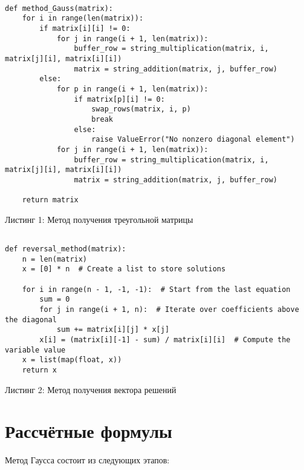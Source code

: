 \documentclass[14pt]{article}
\begin{document}
\begin{mdframed}
\footnotesize
\begin{verbatim}

def method_Gauss(matrix):
    for i in range(len(matrix)):
        if matrix[i][i] != 0:
            for j in range(i + 1, len(matrix)):
                buffer_row = string_multiplication(matrix, i, matrix[j][i], matrix[i][i])
                matrix = string_addition(matrix, j, buffer_row)
        else:
            for p in range(i + 1, len(matrix)):
                if matrix[p][i] != 0:
                    swap_rows(matrix, i, p)
                    break
                else:
                    raise ValueError("No nonzero diagonal element")
            for j in range(i + 1, len(matrix)):
                buffer_row = string_multiplication(matrix, i, matrix[j][i], matrix[i][i])
                matrix = string_addition(matrix, j, buffer_row)

    return matrix

\end{verbatim}
\end{mdframed}
\begin{center}
    Листинг 1: Метод получения треугольной матрицы
\end{center}

\begin{mdframed}
\small
\begin{verbatim}

def reversal_method(matrix):
    n = len(matrix)
    x = [0] * n  # Create a list to store solutions

    for i in range(n - 1, -1, -1):  # Start from the last equation
        sum = 0
        for j in range(i + 1, n):  # Iterate over coefficients above the diagonal
            sum += matrix[i][j] * x[j]
        x[i] = (matrix[i][-1] - sum) / matrix[i][i]  # Compute the variable value
    x = list(map(float, x))
    return x

\end{verbatim}
\end{mdframed}
\begin{center}
    Листинг 2: Метод получения вектора решений
\end{center}

\newpage

\section{Рассчётные формулы}

Метод Гаусса состоит из следующих этапов:
\end{document}
